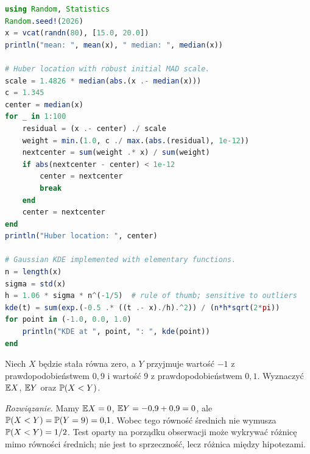 \begin{lstlisting}[language=Julia,caption={Kompletny program: odporna estymacja i jądrowa estymacja gęstości (Julia, Random i Statistics).}]
using Random, Statistics
Random.seed!(2026)
x = vcat(randn(80), [15.0, 20.0])
println("mean: ", mean(x), " median: ", median(x))

# Huber location with robust initial MAD scale.
scale = 1.4826 * median(abs.(x .- median(x)))
c = 1.345
center = median(x)
for _ in 1:100
    residual = (x .- center) ./ scale
    weight = min.(1.0, c ./ max.(abs.(residual), 1e-12))
    nextcenter = sum(weight .* x) / sum(weight)
    if abs(nextcenter - center) < 1e-12
        center = nextcenter
        break
    end
    center = nextcenter
end
println("Huber location: ", center)

# Gaussian KDE implemented with elementary functions.
n = length(x)
sigma = std(x)
h = 1.06 * sigma * n^(-1/5)  # rule of thumb; sensitive to outliers
kde(t) = sum(exp.(-0.5 .* ((t .- x)./h).^2)) / (n*h*sqrt(2*pi))
for point in (-1.0, 0.0, 1.0)
    println("KDE at ", point, ": ", kde(point))
end
\end{lstlisting}

\begin{zadanie}
Niech $X$ będzie stała równa zero, a $Y$ przyjmuje
wartość $-1$ z prawdopodobieństwem $0{,}9$ i wartość
$9$ z prawdopodobieństwem $0{,}1$. Wyznaczyć
$\mathbb E X$, $\mathbb E Y$ oraz $\mathbb P(X<Y)$.
\par\emph{Rozwiązanie.} Mamy $\mathbb E X=0$,
$\mathbb E Y=-0{,}9+0{,}9=0$, ale
$\mathbb P(X<Y)=\mathbb P(Y=9)=0{,}1$.
Wobec tego równość średnich nie wymusza
$\mathbb P(X<Y)=1/2$. Test oparty na porządku obserwacji
może wykrywać różnicę mimo równości średnich;
nie jest to sprzeczność, lecz różnica między hipotezami.
\end{zadanie}


